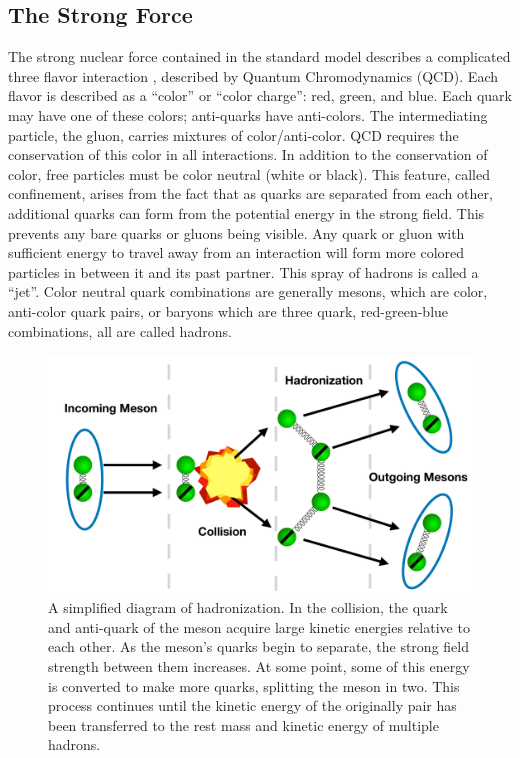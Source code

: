 \subsection{The Strong Force}
\label{sec:QCD}
The strong nuclear force contained in the standard model describes a complicated three flavor interaction \SUthree, described by Quantum Chromodynamics (QCD). Each flavor is described as a ``color'' or ``color charge'': red, green, and blue. Each quark may have one of these colors; anti-quarks have anti-colors. The intermediating particle, the gluon, carries mixtures of color/anti-color. QCD requires the conservation of this color in all interactions. In addition to the conservation of color, free particles must be color neutral (white or black). This feature, called confinement, arises from the fact that as quarks are separated from each other, additional quarks can form from the potential energy in the strong field. This prevents any bare quarks or gluons being visible. Any quark or gluon with sufficient energy to travel away from an interaction will form more colored particles in between it and its past partner. This spray of hadrons is called a ``jet''. Color neutral quark combinations are generally mesons, which are color, anti-color quark pairs, or baryons which are three quark, red-green-blue combinations, all are called hadrons.
\begin{figure}[!btp]
    \centering
    \includegraphics[width=\textwidth]{figures/hadronization.pdf}
    \caption[Hadronization of a meson.]
       {A simplified diagram of hadronization. In the collision, the quark and anti-quark of the meson acquire large kinetic energies relative to each other. As the meson's quarks begin to separate, the strong field strength between them increases. At some point, some of this energy is converted to make more quarks, splitting the meson in two.  This process continues until the kinetic energy of the originally \qqbar pair has been transferred to the rest mass and kinetic energy of multiple hadrons.}
    \label{fig:hadronization}
\end{figure}

